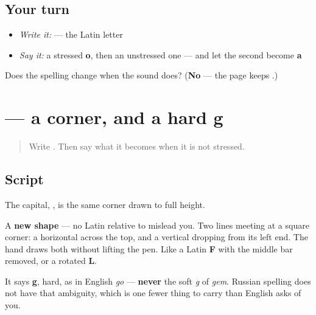 \subsection*{Your turn}
\begin{itemize}
\raggedright
  \item \emph{Write it:}  — the Latin letter
  \item \emph{Say it:} a stressed \textbf{o}, then an unstressed one — and let the second become \textbf{a}
\end{itemize}

\begin{tcolorbox}[breakable,colback=teal!4,colframe=teal!35!black,title={Before you move on}]
Does the spelling change when the sound does? (\textbf{No} — the page keeps .)
\end{tcolorbox}
\section[\texorpdfstring{\ru{г} (g)}{г (g)}]{ — a corner, and a hard g}

\label{lesson:RU-W07-g}



\begin{quote}
Write . Then say what it becomes when it is not stressed.
\end{quote}

\subsection*{Script}

\begin{quote}
   
\end{quote}

The capital, \textbf{}, is the same corner drawn to full height.

A \textbf{new shape} — no Latin relative to mislead you. Two lines meeting at a square corner: a horizontal across the top, and a vertical dropping from its left end. The hand draws both without lifting the pen. Like a Latin \textbf{F} with the middle bar removed, or a rotated \textbf{L}.

It says \textbf{g}, hard, as in English \emph{go} — \textbf{never} the soft \emph{g} of \emph{gem}. Russian spelling does not have that ambiguity, which is one fewer thing to carry than English asks of you.

